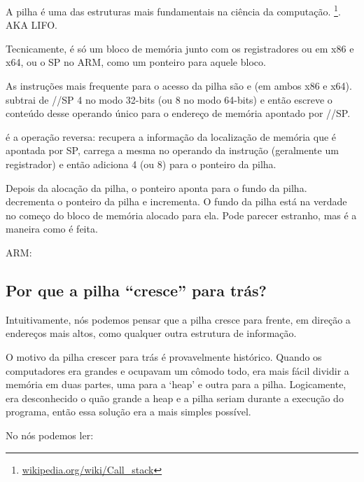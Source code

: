 \mysection{\Stack}
\label{sec:stack}
\myindex{\Stack}

A pilha é uma das estruturas mais fundamentais na ciência da computação.
\footnote{\href{http://go.yurichev.com/17119}{wikipedia.org/wiki/Call\_stack}}.
\ac{AKA} \ac{LIFO}.

Tecnicamente, é só um bloco de memória junto com os registradores \ESP ou \RSP em x86 e x64, ou o \ac{SP} no ARM, como um ponteiro para aquele bloco.

As instruções mais frequente para o acesso da pilha são \PUSH e \POP (em ambos x86 e x64).
\PUSH subtrai de \ESP/\RSP/\ac{SP} 4 no modo 32-bits (ou 8 no modo 64-bits) e então escreve o conteúdo desse operando único para o endereço de memória apontado por \ESP/\RSP/\ac{SP}.

\POP é a operação reversa: recupera a informação da localização de memória que é apontada por \ac{SP}, 
carrega a mesma no operando da instrução (geralmente um registrador) e então adiciona 4 (ou 8) para o ponteiro da pilha.

Depois da alocação da pilha, o ponteiro aponta para o fundo da pilha.
\PUSH decrementa o ponteiro da pilha e \POP incrementa. O fundo da pilha está na verdade no começo do bloco de memória alocado para ela.
Pode parecer estranho, mas é a maneira como é feita.

ARM: \PTBRph{}

\subsection{Por que a pilha ``cresce'' para trás?}
\label{stack_grow_backwards}

Intuitivamente, nós podemos pensar que a pilha cresce para frente, em direção a endereços mais altos, como qualquer outra estrutura de informação.

O motivo da pilha crescer para trás é provavelmente histórico. Quando os computadores era grandes e ocupavam um cômodo todo, era mais fácil dividir a memória em duas partes, uma para a ‘heap’ e outra para a pilha.
Logicamente, era desconhecido o quão grande a heap e a pilha seriam durante a execução do programa, então essa solução era a mais simples possível.



No \RitchieThompsonUNIX nós podemos ler:

